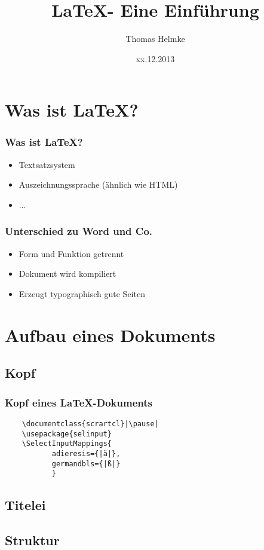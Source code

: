 \documentclass{beamer}
\title{\LaTeX - Eine Einführung}
\author{Thomas Helmke}
\date{xx.12.2013}
\begin{document}
\maketitle
\frame{\tableofcontents}
 
\section{Was ist \LaTeX?}
\begin{frame}[<+->] %
	\frametitle{Was ist \LaTeX?} %
	\begin{itemize}
		\item Textsatzsystem
		\item Auszeichnungssprache (ähnlich wie HTML)
		\item ...
	\end{itemize}
\end{frame}
\begin{frame}[<+->] %
	\frametitle{Unterschied zu Word und Co.} %
	\begin{itemize}
		\item Form und Funktion getrennt
		\item Dokument wird kompiliert
		\item Erzeugt typographisch gute Seiten 
	\end{itemize}
\end{frame}

\setbeamercovered{}
\section{Aufbau eines Dokuments}
\subsection{Kopf}
\begin{frame}[fragile] %
	\frametitle{Kopf eines \LaTeX-Dokuments} %
	\begin{lstlisting}
	\documentclass{scrartcl}|\pause|
	\usepackage{selinput}
	\SelectInputMappings{
		   adieresis={|ä|},
		   germandbls={|ß|}
		   }
	\end{lstlisting}
\end{frame}
\subsection{Titelei}
\subsection{Struktur}
\end{document}
